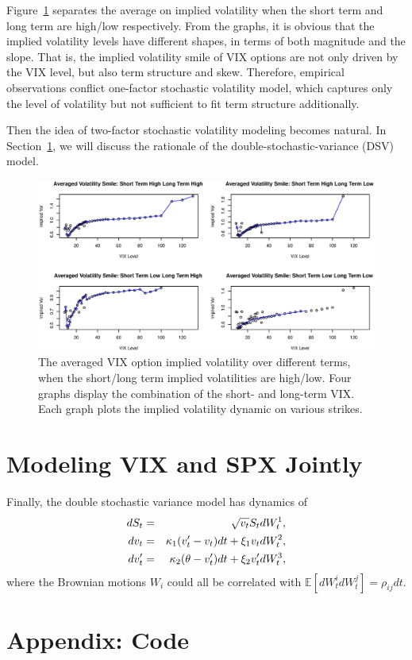 \documentclass[11pt,reqno,final]{amsart}
\begin{document}
Figure~\ref{four_vix} separates the average on implied volatility when the short term and long term are high/low respectively. From the graphs, it is obvious that the implied volatility levels have different shapes, in terms of both magnitude and the slope. That is, the implied volatility smile of VIX options are not only driven by the VIX level, but also term structure and skew. Therefore, empirical observations conflict one-factor stochastic volatility model, which captures only the level of volatility but not sufficient to fit term structure additionally.

Then the idea of two-factor stochastic volatility modeling becomes natural. In Section~\ref{sec::vix_model}, we will discuss the rationale of the double-stochastic-variance (DSV) model.

\begin{figure}
  \centering
  \includegraphics[scale=0.6]{four_vix.eps}
  \caption{The averaged VIX option implied volatility over different terms, when the short/long term implied volatilities are high/low. Four graphs display the combination of the short- and long-term VIX. Each graph plots the implied volatility dynamic on various strikes.}\label{four_vix}
\end{figure}


\bigskip


\section{Modeling VIX and SPX Jointly} \label{sec::vix_model}



Finally, the double stochastic variance model has dynamics of
\begin{eqnarray}
dS_t &=& \sqrt{v_t} S_t d W_t^1, \notag \\
dv_t &=& \kappa_1 (v_t' - v_t) dt + \xi_1 v_t dW_t^2, \\
dv_t' &=& \kappa_2 (\theta - v_t') dt + \xi_2 v_t' dW_t^3, \notag \\
\end{eqnarray}
where the Brownian motions $W_i$ could all be correlated with $\mathbb{E}[dW_t^i dW_t^j]=\rho_{ij} dt$. 
%
%
\newpage


%
%
\newpage
\section*{Appendix: Code}

\end{document}
